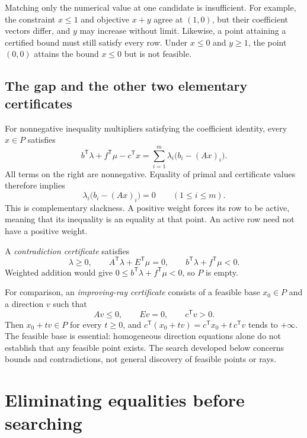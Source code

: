 \documentclass[11pt,letterpaper]{article}
\newcommand{\T}{\mathsf T}
\theoremstyle{definition}
\theoremstyle{remark}
\numberwithin{equation}{section}
\begin{document}
Matching only the numerical value at one candidate is insufficient. For
example, the constraint \(x\le1\) and objective \(x+y\) agree at \((1,0)\),
but their coefficient vectors differ, and \(y\) may increase without limit.
Likewise, a point attaining a certified bound must still satisfy every row.
Under \(x\le0\) and \(y\ge1\), the point \((0,0)\) attains the bound \(x\le0\)
but is not feasible.

\subsection{The gap and the other two elementary certificates}

For nonnegative inequality multipliers satisfying the coefficient identity,
every \(x\in P\) satisfies
\begin{equation}\label{eq:gap}
 b^\T\lambda+f^\T\mu-c^\T x
   =\sum_{i=1}^m\lambda_i\bigl(b_i-(Ax)_i\bigr).
\end{equation}
All terms on the right are nonnegative. Equality of primal and certificate
values therefore implies
\[
 \lambda_i\bigl(b_i-(Ax)_i\bigr)=0\qquad(1\le i\le m).
\]
This is complementary slackness. A positive weight forces its row to be
active, meaning that its inequality is an equality at that point.
An active row need not have a positive weight.

A \emph{contradiction certificate} satisfies
\begin{equation}\label{eq:contradiction}
 \lambda\ge0,\qquad A^\T\lambda+E^\T\mu=0,\qquad
 b^\T\lambda+f^\T\mu<0.
\end{equation}
Weighted addition would give
\(0\le b^\T\lambda+f^\T\mu<0\), so \(P\) is empty.

For comparison, an \emph{improving-ray certificate} consists of a feasible
base \(x_0\in P\) and a direction \(v\) such that
\begin{equation}\label{eq:ray}
 Av\le0,\qquad Ev=0,\qquad c^\T v>0.
\end{equation}
Then \(x_0+t v\in P\) for every \(t\ge0\), and
\(c^\T(x_0+t v)=c^\T x_0+t\,c^\T v\) tends to \(+\infty\).
The feasible base is essential: homogeneous direction equations alone do not
establish that any feasible point exists. The search developed below concerns
bounds and contradictions, not general discovery of feasible points or rays.

\section{Eliminating equalities before searching}
\label{sec:elimination}
\end{document}
